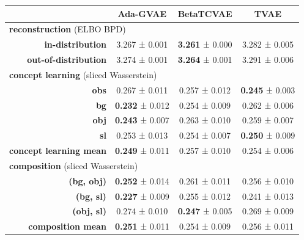 \begin{tabular}{rccc}
\toprule
& \textbf{Ada-GVAE} & \textbf{BetaTCVAE} & \textbf{TVAE} \\
\midrule
\multicolumn{ 4 }{l}{\textbf{reconstruction}  (ELBO BPD)} \\
\midrule
\textbf{in-distribution} & 3.267 ± 0.001 & \textbf{3.261} ± 0.000 & 3.282 ± 0.005 \\
\textbf{out-of-distribution} & 3.274 ± 0.001 & \textbf{3.264} ± 0.001 & 3.291 ± 0.006 \\
\midrule
\multicolumn{ 4 }{l}{\textbf{concept learning}  (sliced Wasserstein)} \\
\midrule
\textbf{obs} & 0.267 ± 0.011 & 0.257 ± 0.012 & \textbf{0.245} ± 0.003 \\
\textbf{bg} & \textbf{0.232} ± 0.012 & 0.254 ± 0.009 & 0.262 ± 0.006 \\
\textbf{obj} & \textbf{0.243} ± 0.007 & 0.263 ± 0.010 & 0.259 ± 0.007 \\
\textbf{sl} & 0.253 ± 0.013 & 0.254 ± 0.007 & \textbf{0.250} ± 0.009 \\
\addlinespace
\textbf{concept learning mean} & \textbf{0.249} ± 0.011 & 0.257 ± 0.010 & 0.254 ± 0.006 \\
\midrule
\multicolumn{ 4 }{l}{\textbf{composition}  (sliced Wasserstein)} \\
\midrule
\textbf{(bg, obj)} & \textbf{0.252} ± 0.014 & 0.261 ± 0.011 & 0.256 ± 0.010 \\
\textbf{(bg, sl)} & \textbf{0.227} ± 0.009 & 0.255 ± 0.012 & 0.241 ± 0.013 \\
\textbf{(obj, sl)} & 0.274 ± 0.010 & \textbf{0.247} ± 0.005 & 0.269 ± 0.009 \\
\addlinespace
\textbf{composition mean} & \textbf{0.251} ± 0.011 & 0.254 ± 0.009 & 0.256 ± 0.011 \\
\midrule
\bottomrule
\end{tabular}